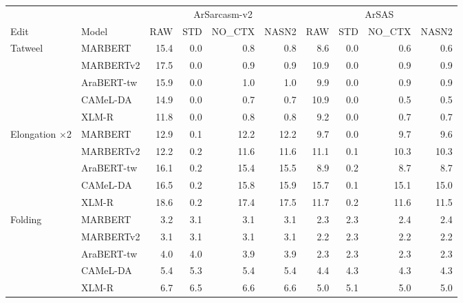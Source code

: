 \begin{tabular}{llrrrrrrrr}
\toprule
 & & \multicolumn{4}{c}{ArSarcasm-v2} & \multicolumn{4}{c}{ArSAS} \\
Edit & Model & RAW & STD & NO\_CTX & NASN2 & RAW & STD & NO\_CTX & NASN2 \\
\midrule
Tatweel & MARBERT & 15.4 & 0.0 & 0.8 & 0.8 & 8.6 & 0.0 & 0.6 & 0.6 \\
 & MARBERTv2 & 17.5 & 0.0 & 0.9 & 0.9 & 10.9 & 0.0 & 0.9 & 0.9 \\
 & AraBERT-tw & 15.9 & 0.0 & 1.0 & 1.0 & 9.9 & 0.0 & 0.9 & 0.9 \\
 & CAMeL-DA & 14.9 & 0.0 & 0.7 & 0.7 & 10.9 & 0.0 & 0.5 & 0.5 \\
 & XLM-R & 11.8 & 0.0 & 0.8 & 0.8 & 9.2 & 0.0 & 0.7 & 0.7 \\
\midrule
Elongation $\times$2 & MARBERT & 12.9 & 0.1 & 12.2 & 12.2 & 9.7 & 0.0 & 9.7 & 9.6 \\
 & MARBERTv2 & 12.2 & 0.2 & 11.6 & 11.6 & 11.1 & 0.1 & 10.3 & 10.3 \\
 & AraBERT-tw & 16.1 & 0.2 & 15.4 & 15.5 & 8.9 & 0.2 & 8.7 & 8.7 \\
 & CAMeL-DA & 16.5 & 0.2 & 15.8 & 15.9 & 15.7 & 0.1 & 15.1 & 15.0 \\
 & XLM-R & 18.6 & 0.2 & 17.4 & 17.5 & 11.7 & 0.2 & 11.6 & 11.5 \\
\midrule
Folding & MARBERT & 3.2 & 3.1 & 3.1 & 3.1 & 2.3 & 2.3 & 2.4 & 2.4 \\
 & MARBERTv2 & 3.1 & 3.1 & 3.1 & 3.1 & 2.2 & 2.3 & 2.2 & 2.2 \\
 & AraBERT-tw & 4.0 & 4.0 & 3.9 & 3.9 & 2.3 & 2.3 & 2.3 & 2.3 \\
 & CAMeL-DA & 5.4 & 5.3 & 5.4 & 5.4 & 4.4 & 4.3 & 4.3 & 4.3 \\
 & XLM-R & 6.7 & 6.5 & 6.6 & 6.6 & 5.0 & 5.1 & 5.0 & 5.0 \\
\bottomrule
\end{tabular}
